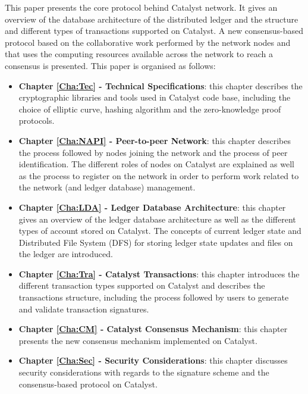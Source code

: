 This paper presents the core protocol behind Catalyst network. It gives an overview of the database architecture of the distributed ledger and the structure and different types of transactions supported on Catalyst. A new consensus-based protocol based on the collaborative work performed by the network nodes and that uses the computing resources available across the network to reach a consensus is presented. This paper is organised as follows:

\begin{itemize}
\item \textbf{Chapter \ref{Cha:Tec} - Technical Specifications}: this chapter describes the cryptographic libraries and tools used in Catalyst code base, including the choice of elliptic curve, hashing algorithm and the zero-knowledge proof protocols. 

\item \textbf{Chapter \ref{Cha:NAPI} - Peer-to-peer Network}: this chapter describes the process followed by nodes joining the network and the process of peer identification. The different roles of nodes on Catalyst are explained as well as the process to register on the network in order to perform work related to the network (and ledger database) management. 

\item \textbf{Chapter \ref{Cha:LDA} - Ledger Database Architecture}: this chapter gives an overview of the ledger database architecture as well as the different types of account stored on Catalyst. The concepts of current ledger state and Distributed File System (DFS) for storing ledger state updates and files on the ledger are introduced. 

\item \textbf{Chapter \ref{Cha:Tra} - Catalyst Transactions}: this chapter introduces the different transaction types supported on Catalyst and describes the transactions structure, including the process followed by users to generate and validate transaction signatures. 

\item \textbf{Chapter \ref{Cha:CM} - Catalyst Consensus Mechanism}: this chapter presents the new consensus mechanism implemented on Catalyst. 



\item \textbf{Chapter \ref{Cha:Sec} - Security Considerations}: this chapter discusses security considerations with regards to the signature scheme and the consensus-based protocol on Catalyst. 

\end{itemize}